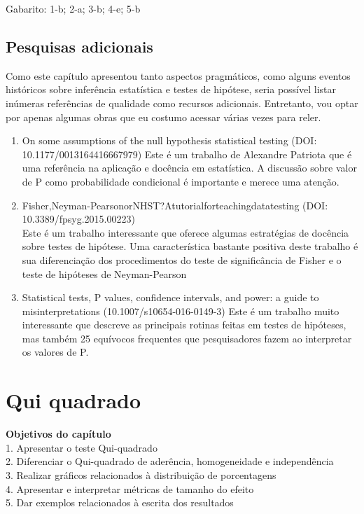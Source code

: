 \documentclass[
]{book}
\begin{document}
\begin{mirror}

Gabarito: 1-b; 2-a; 3-b; 4-e; 5-b

\end{mirror}

\hypertarget{pesquisas-adicionais}{%
\section{Pesquisas adicionais}\label{pesquisas-adicionais}}

Como este capítulo apresentou tanto aspectos pragmáticos, como alguns eventos históricos sobre inferência estatística e testes de hipótese, seria possível listar inúmeras referências de qualidade como recursos adicionais. Entretanto, vou optar por apenas algumas obras que eu costumo acessar várias vezes para reler.

\begin{enumerate}
\def\labelenumi{\arabic{enumi}.}
\item
  On some assumptions of the null hypothesis statistical testing (DOI: 10.1177/0013164416667979)
  Este é um trabalho de Alexandre Patriota que é uma referência na aplicação e docência em estatística. A discussão sobre valor de P como probabilidade condicional é importante e merece uma atenção.
\item
  Fisher,Neyman-PearsonorNHST?Atutorialforteachingdatatesting (DOI: 10.3389/fpsyg.2015.00223)\\
  Este é um trabalho interessante que oferece algumas estratégias de docência sobre testes de hipótese. Uma característica bastante positiva deste trabalho é sua diferenciação dos procedimentos do teste de significância de Fisher e o teste de hipóteses de Neyman-Pearson
\item
  Statistical tests, P values, confidence intervals, and power: a guide to misinterpretations (10.1007/s10654-016-0149-3)
  Este é um trabalho muito interessante que descreve as principais rotinas feitas em testes de hipóteses, mas também 25 equívocos frequentes que pesquisadores fazem ao interpretar os valores de P.
\end{enumerate}

\hypertarget{qui-quadrado}{%
\chapter{Qui quadrado}\label{qui-quadrado}}

\begin{objectives}
\textbf{Objetivos do capítulo}\\
1. Apresentar o teste Qui-quadrado\\
2. Diferenciar o Qui-quadrado de aderência, homogeneidade e
independência\\
3. Realizar gráficos relacionados à distribuição de porcentagens\\
4. Apresentar e interpretar métricas de tamanho do efeito\\
5. Dar exemplos relacionados à escrita dos resultados
\end{objectives}
\end{document}

